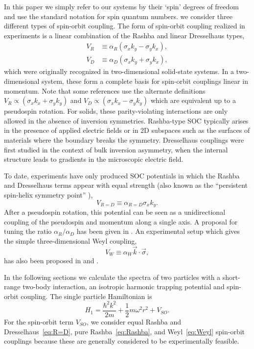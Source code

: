 \documentclass[%
 onecolumn,
 notitlepage,
 amsmath,amssymb,
 aps,
]{revtex4-1}
\begin{document}
In this paper we simply refer to our systems by their `spin' degrees of freedom and use the standard notation for spin quantum numbers. we consider three different types of spin-orbit coupling. The form of spin-orbit coupling realized in experiments is a linear combination of the Rashba \cite{0022-3719-17-33-015} and linear Dresselhaus \cite{PhysRev.100.580} types,
\begin{align}
V_{R}&\equiv\alpha_R (\sigma_x k_y-\sigma_y k_x) \label{eq:Rashba},\\
V_{D}&\equiv\alpha_D (\sigma_x k_y+\sigma_y k_x) \label{eq:Dresselhaus},
\end{align} 
which were originally recognized in two-dimensional solid-state systems. In a two-dimensional system, these form a complete basis for spin-orbit couplings linear in momentum. Note that some references use the alternate definitions $V_R\propto  (\sigma_x k_x+\sigma_y k_y) $ and $V_D\propto  (\sigma_x k_x-\sigma_y k_y) $ which are equivalent up to a pseudospin rotation.  For solids, these parity-violating interactions are only allowed in the absence of inversion symmetries. Rashba-type SOC typically arises in the presence of applied electric fields or in 2D subspaces such as the surfaces of materials where the boundary breaks the symmetry. Dresselhaus couplings were first studied in the context of bulk inversion asymmetry, when the internal structure leads to gradients in the microscopic electric field. 

To date, experiments have only produced SOC potentials in which the Rashba and Dresselhaus terms appear with equal strength (also known as the ``persistent spin-helix symmetry point'' \cite{PhysRevLett.97.236601}), 
\begin{equation}
\label{eq:R=D}
V_{R=D}\equiv\alpha_{R=D}\sigma_x k_y.
\end{equation} 
After a pseudospin rotation, this potential can be seen as a unidirectional coupling of the pseudospin and momentum along a single axis. A proposal for tuning the ratio $\alpha_R/\alpha_D$ has been given in \cite{PhysRevA.84.025602}.  An experimental setup which gives the simple three-dimensional Weyl coupling,
\begin{equation}\label{eq:Weyl}
V_{W}\equiv\alpha_W \vec{k}\cdot\vec{\sigma},
\end{equation}
has also been proposed in \cite{PhysRevLett.108.235301} and \cite{PhysRevLett.111.125301}. 

In the following sections we calculate the spectra of two particles with a short-range two-body interaction, an isotropic harmonic trapping potential and spin-orbit coupling. The single particle Hamiltonian is 
\begin{equation}\label{eq:shortRangeInteraction}
H_1=\frac{\hbar^2 k^2}{2m}+\frac{1}{2}m\omega^2 r^2 + V_{SO}.
\end{equation}
For the spin-orbit term $V_{SO}$, we consider equal Rashba and Dresselhaus~\eqref{eq:R=D}, pure Rashba~\eqref{eq:Rashba}, and Weyl~\eqref{eq:Weyl} spin-orbit couplings  because these are generally considered to be experimentally feasible.
\end{document}
